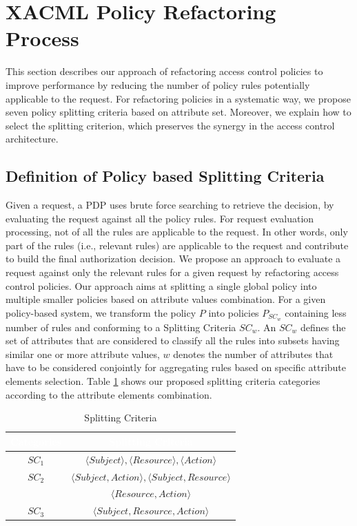 \section{XACML Policy Refactoring Process} \label{sec:approach}
This section describes our approach of refactoring access control policies to improve performance by reducing the number of policy rules potentially applicable to the request.
For refactoring policies in a systematic way, we propose seven policy splitting criteria based on attribute set. 
Moreover, we explain how to select the splitting criterion, which preserves the synergy in the access control architecture.

\subsection{Definition of Policy based Splitting Criteria} \label{subsec:SplittingCriteria}
Given a request, a PDP uses brute force searching to retrieve the decision, by evaluating the request against all the policy rules. 
For request evaluation processing, not of all the rules are applicable to the request.
In other words, only part of the rules (i.e., relevant rules) are applicable to the request and contribute
to build the final authorization decision. We propose an approach to evaluate a request against only the relevant rules for a given request by refactoring
access control policies. Our approach aims at splitting a single global policy into multiple smaller policies based on attribute values combination. 
For a given policy-based system, we transform the policy \normalsize $P$ into 
policies \normalsize $P_{SC_{w}}$ containing less number of rules and conforming to a Splitting Criteria $SC_{w}$. 
An $SC_{w}$ defines the set of attributes that are considered 
to classify all the rules into subsets having similar one or more attribute values, $w$ denotes the number of attributes that have to be considered conjointly 
for aggregating rules based on specific attribute elements selection. Table \ref{table1} shows our proposed splitting criteria categories according to
 the attribute elements combination.

\begin{table}[h!]
\centering
\setlength{\extrarowheight}{6 pt}
\begin{tabular}{|>{\small}c|>{\small}c|}
\hline \rowcolor{black}
\bf
\textcolor{white}{Categories}& \bf \textcolor{white}{Splitting Criteria}\\ \hline
$SC_{1}$& {$\langle Subject \rangle, \langle Resource\rangle, \langle Action\rangle$}\\ \hline
$SC_{2}$& {$\langle Subject,Action \rangle, \langle Subject,Resource\rangle$}\\&{$\langle Resource,Action\rangle$}\\ \hline
$SC_{3}$& {$\langle Subject,Resource,Action\rangle$}\\ \hline
\end{tabular}
\caption{Splitting Criteria}
\label{table1}\end{table}



